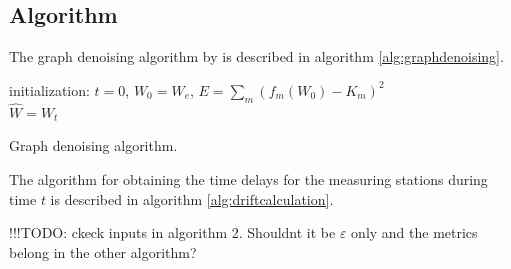 \documentclass[12pt, sumlimits, intlimits]{article}
\newcommand\todo[1]{{\color{red}!!!TODO: #1}}
\begin{document}
\subsection{Algorithm}
The graph denoising algorithm by \cite{Spyrou2017} is described in algorithm \ref{alg:graphdenoising}. 

\begin{algorithm}[H]
	initialization: $t = 0$, $W_0 = W_e$, $E = \sum_{m}(f_m(W_0) - K_m)^2$\\
	$\hat{W} = W_t$
	\caption{Graph denoising algorithm.}
	\label{alg:graphdenoising}
\end{algorithm}

The algorithm for obtaining the time delays for the measuring stations during time $t$ is described in algorithm \ref{alg:driftcalculation}.

\iffalse
\todo{ckeck inputs in algorithm 2. Shouldnt it be $\varepsilon$ only and the metrics belong in the other algorithm?}
\end{document}
